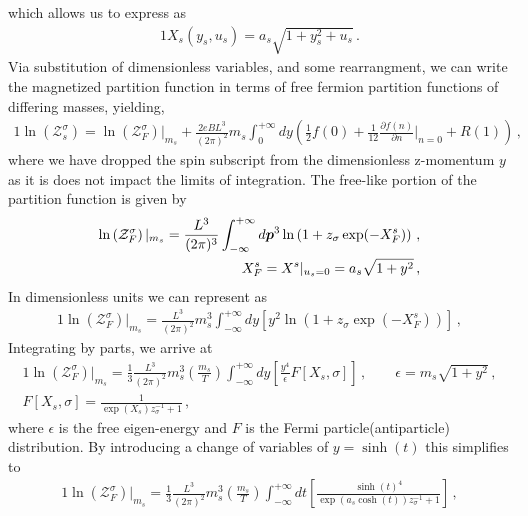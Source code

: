 which allows us to express  as
\begin{alignat}{1}
    \label{UnitlessBoltz} X_{s}(y_{s},u_{s})=a_{s}\sqrt{1+y_{s}^{2}+u_{s}}\,.
\end{alignat}
Via substitution of dimensionless variables, and some rearrangment, we can write the magnetized partition function in terms of free fermion partition functions of differing masses, yielding,
\begin{alignat}{1}
    \label{Equality} \ln\left(\mathcal{Z}^{\sigma}_{s}\right) = \ln\left(\mathcal{Z}^{\sigma}_{F}\right)|_{m_{s}} + \frac{2eBL^{3}}{(2\pi)^{2}}m_{s}\int_{0}^{+\infty}dy\left(\frac{1}{2}f(0) + \frac{1}{12}\frac{\partial f(n)}{\partial n}\bigg\rvert_{n=0} + R(1)\right)\,,
\end{alignat}
where we have dropped the spin subscript from the dimensionless z-momentum $y$ as it is does not impact the limits of integration. The free-like portion of the partition function is given by
\begin{align}
    \label{Freelike} \ln\left(\mathcal{Z}^{\sigma}_{F}\right)|_{m_{s}}=\frac{L^{3}}{(2\pi)^{3}}\int^{+\infty}_{-\infty}d\boldsymbol{p}^{3}\ln\left(1+z_{\sigma}\exp(-X^{s}_{F})\right)\,,\\
    X^{s}_{F} = X^{s}\vert_{u_{s}=0} = a_{s}\sqrt{1+y^{2}}\,,
\end{align}
In dimensionless units we can represent  as
\begin{alignat}{1}
    \label{FreelikeAlt} \ln\left(\mathcal{Z}^{\sigma}_{F}\right)|_{m_{s}}=\frac{L^{3}}{(2\pi)^{2}}m_{s}^{3}\int^{+\infty}_{-\infty}dy\left[y^{2}\ln\left(1+z_{\sigma}\exp(-X^{s}_{F})\right)\right]\,,
\end{alignat}
Integrating by parts, we arrive at
\begin{alignat}{1}
    \label{FreelikeParts} \ln\left(\mathcal{Z}^{\sigma}_{F}\right)|_{m_{s}}=\frac{1}{3}\frac{L^{3}}{(2\pi)^{2}}m_{s}^{3}\left(\frac{m_{s}}{T}\right)\int^{+\infty}_{-\infty}dy\left[\frac{y^{4}}{\epsilon}F[X_{s},\sigma]\right]\,,\qquad \epsilon=m_{s}\sqrt{1+y^{2}}\,,\\
    \label{FermD} F[X_{s},\sigma] = \frac{1}{\exp(X_{s})z_{\sigma}^{-1}+1}\,,
\end{alignat}
where $\epsilon$ is the free eigen-energy and $F$ is the Fermi particle(antiparticle) distribution. By introducing a change of variables of $y=\sinh(t)$ this simplifies to
\begin{alignat}{1}
    \label{FreelikeFinal} \ln\left(\mathcal{Z}^{\sigma}_{F}\right)|_{m_{s}}=\frac{1}{3}\frac{L^{3}}{(2\pi)^{2}}m_{s}^{3}\left(\frac{m_{s}}{T}\right)\int^{+\infty}_{-\infty}dt\left[\frac{\sinh(t)^{4}}{\exp(a_{s}\cosh(t))z_{\sigma}^{-1}+1}\right]\,,
\end{alignat}
